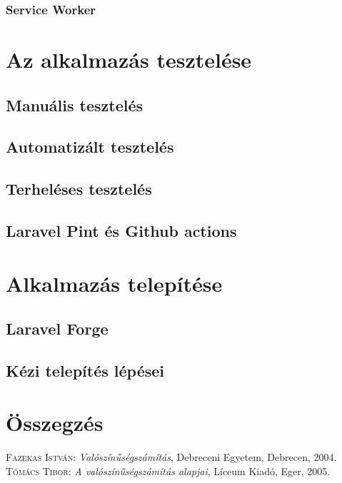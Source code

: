 \documentclass[
]{thesis-ekf}
\theoremstyle{definition}
\theoremstyle{remark}
\begin{document}
\subsection{Service Worker}

\chapter{Az alkalmazás tesztelése}
\section{Manuális tesztelés}
\section{Automatizált tesztelés}
\section{Terheléses tesztelés}
\section{Laravel Pint és Github actions}

\chapter{Alkalmazás telepítése}
\section{Laravel Forge}
\section{Kézi telepítés lépései}

\chapter*{Összegzés}

\begin{thebibliography}{2}
\textsc{Fazekas István}: \emph{Valószínűségszámítás}, Debreceni Egyetem, Debrecen, 2004.
\textsc{Tómács Tibor}: \emph{A valószínűségszámítás alapjai}, Líceum Kiadó, Eger, 2005.
\end{thebibliography}


\end{document}
